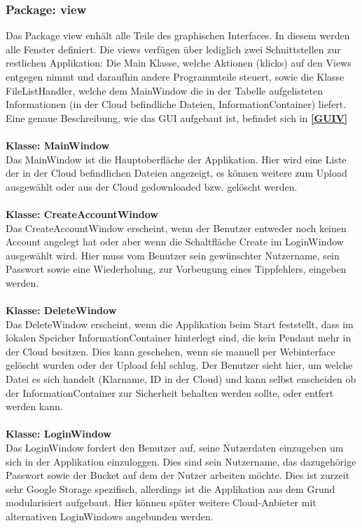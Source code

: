 \documentclass[13pt,a4paper,bibliography=totocnumbered,listof=totocnumbered]{scrartcl}
\newcommand*{\fullref}[1]{\textbf{\hyperref[{#1}]{\ref*{#1} \nameref*{#1}}}}
\begin{document}
\subsubsection{Package: view}
Das Package view enhält alle Teile des graphischen Interfaces. In diesem werden alle Fenster definiert. Die views verfügen über lediglich zwei Schnittstellen zur restlichen Applikation: Die Main Klasse, welche Aktionen (klicks) auf den Views entgegen nimmt und daraufhin andere Programmteile steuert, sowie die Klasse FileListHandler, welche dem MainWindow die in der Tabelle aufgelisteten Informationen (in der Cloud befindliche Dateien, InformationContainer) liefert. Eine genaue Beschreibung, wie das GUI aufgebaut ist, befindet sich in \fullref{GUIV}\\\\
\textbf{Klasse: MainWindow}\\
Das MainWindow ist die Hauptoberfläche der Applikation. Hier wird eine Liste der in der Cloud befindlichen Dateien angezeigt, es können weitere zum Upload ausgewählt oder aus der Cloud gedownloaded bzw. gelöscht werden.\\\\
\textbf{Klasse: CreateAccountWindow}\\
Das CreateAccountWindow erscheint, wenn der Benutzer entweder noch keinen Account angelegt hat oder aber wenn die Schaltfläche Create im LoginWindow ausgewählt wird. Hier muss vom Benutzer sein gewünschter Nutzername, sein Passwort sowie eine Wiederholung, zur Vorbeugung eines Tippfehlers, eingeben werden.\\\\
\textbf{Klasse: DeleteWindow}\\
Das DeleteWindow erscheint, wenn die Applikation beim Start feststellt, dass im lokalen Speicher InformationContainer hinterlegt sind, die kein Pendant mehr in der Cloud besitzen. Dies kann geschehen, wenn sie manuell per Webinterface gelöscht wurden oder der Upload fehl schlug. Der Benutzer sieht hier, um welche Datei es sich handelt (Klarname, ID in der Cloud) und kann selbst enscheiden ob der InformationContainer zur Sicherheit behalten werden sollte, oder entfert werden kann.\\\\
\textbf{Klasse: LoginWindow}\\
Das LoginWindow fordert den Benutzer auf, seine Nutzerdaten einzugeben um sich in der Applikation einzuloggen. Dies sind sein Nutzername, das dazugehörige Passwort sowie der Bucket auf dem der Nutzer arbeiten möchte. Dies ist zurzeit sehr Google Storage spezifisch, allerdings ist die Applikation aus dem Grund modularisiert aufgebaut. Hier können später weitere Cloud-Anbieter mit alternativen LoginWindows angebunden werden.\\\\
\end{document}
